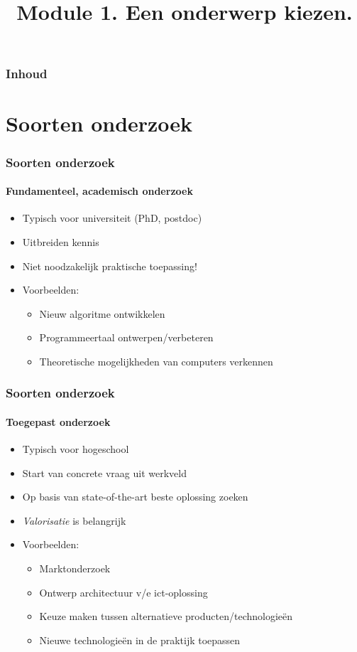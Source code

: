 \documentclass[aspectratio=169]{beamer}
\title{Module 1. Een onderwerp kiezen.}
\subtitle{\coursename}
\author{\lecturers}   %
\date{\academicyear}
\begin{document}
\begin{frame}
  \maketitle
\end{frame}

\begin{frame}
  \frametitle{Inhoud}

  \tableofcontents
\end{frame}

\section{Soorten onderzoek}

\begin{frame}
  \frametitle{Soorten onderzoek}
  \framesubtitle{Fundamenteel, academisch onderzoek}

  \begin{itemize}
    \item Typisch voor universiteit (PhD, postdoc)
    \item Uitbreiden kennis
    \item Niet noodzakelijk praktische toepassing!
    \item Voorbeelden:
          \begin{itemize}
            \item Nieuw algoritme ontwikkelen
            \item Programmeertaal ontwerpen/verbeteren
            \item Theoretische mogelijkheden van computers verkennen
          \end{itemize}
  \end{itemize}

\end{frame}

\begin{frame}
  \frametitle{Soorten onderzoek}
  \framesubtitle{Toegepast onderzoek}

  \begin{itemize}
    \item Typisch voor hogeschool
    \item Start van concrete vraag uit werkveld
    \item Op basis van state-of-the-art beste oplossing zoeken
    \item \textit{Valorisatie} is belangrijk
    \item Voorbeelden:
          \begin{itemize}
            \item Marktonderzoek
            \item Ontwerp architectuur v/e ict-oplossing
            \item Keuze maken tussen alternatieve producten/technologieën
            \item Nieuwe technologieën in de praktijk toepassen
          \end{itemize}
  \end{itemize}

\end{frame}
\end{document}
